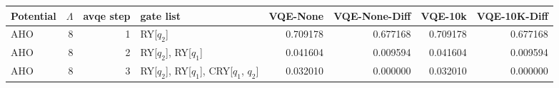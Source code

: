 \begin{tabular}{lrrlrrrr}
\toprule
Potential & $\Lambda$ & avqe step & gate list & VQE-None & VQE-None-Diff & VQE-10k & VQE-10K-Diff \\
\midrule
AHO & 8 & 1 & RY[$q_2$] & 0.709178 & 0.677168 & 0.709178 & 0.677168 \\
AHO & 8 & 2 & RY[$q_2$], RY[$q_1$] & 0.041604 & 0.009594 & 0.041604 & 0.009594 \\
AHO & 8 & 3 & RY[$q_2$], RY[$q_1$], CRY[$q_1$, $q_2$] & 0.032010 & 0.000000 & 0.032010 & 0.000000 \\
\bottomrule
\end{tabular}

